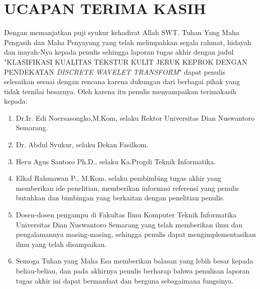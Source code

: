 \documentclass[laporan.tex]{subfiles}
\begin{document}
\chapter*{UCAPAN TERIMA KASIH}

Dengan memanjatkan puji syukur kehadirat Allah SWT. Tuhan Yang Maha Pengasih dan Maha Penyayang yang telah melimpahkan segala rahmat, hidayah dan inayah-Nya kepada penulis sehingga laporan tugas akhir dengan judul "KLASIFIKASI KUALITAS TEKSTUR KULIT JERUK KEPROK DENGAN PENDEKATAN \emph{DISCRETE WAVELET TRANSFORM}" dapat penulis selesaikan sesuai dengan rencana karena dukungan dari berbagai pihak yang tidak ternilai besarnya. Oleh karena itu penulis menyampaikan terimakasih kepada:
\begin{enumerate}
\item Dr.Ir. Edi Noersasongko,M.Kom, selaku Rektor Universitas Dian Nuswantoro Semarang.
\item Dr. Abdul Syukur, selaku Dekan Fasilkom.
\item Heru Agus Santoso Ph.D., selaku Ka.Progdi Teknik Informatika.
\item Elkaf Rahmawan P., M.Kom. selaku pembimbing tugas akhir yang memberikan ide penelitian, memberikan informasi referensi yang penulis butuhkan dan bimbingan yang berkaitan dengan penelitian penulis.
\item Dosen-dosen pengampu di Fakultas Ilmu Komputer Teknik Informatika Universitas Dian Nuswantoro Semarang yang telah memberikan ilmu dan pengalamannya masing-masing, sehingga penulis dapat mengimplementasikan ilmu yang telah disampaikan.
\item Semoga Tuhan yang Maha Esa memberikan balasan yang lebih besar kepada beliau-beliau, dan pada akhirnya penulis berharap bahwa penulisan laporan tugas akhir ini dapat bermanfaat dan berguna sebagaimana fungsinya.
\end{enumerate}
\end{document}
